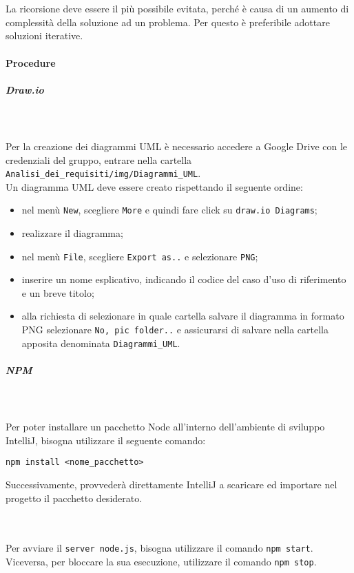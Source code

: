 		 \mbox{} \\ \mbox{} \\
		La ricorsione deve essere il più possibile evitata, perché è causa di un aumento di complessità della soluzione ad un problema. Per questo è preferibile adottare soluzioni iterative.
		\paragraph{Procedure}
	\subparagraph{Draw.io}
	 \mbox{} \\ \mbox{} \\
	Per la creazione dei diagrammi UML è necessario accedere a Google Drive con le credenziali del gruppo, entrare nella cartella \texttt{Analisi\_dei\_requisiti/img/Diagrammi\_UML}. \\ Un diagramma UML deve essere creato rispettando il seguente ordine: \begin{itemize}
\item nel menù \texttt{New}, scegliere \texttt{More} e quindi fare click su \texttt{draw.io Diagrams};
\item realizzare il diagramma;
\item nel menù \texttt{File}, scegliere \texttt{Export as..} e selezionare \texttt{PNG};
\item inserire un nome esplicativo, indicando il codice del caso d'uso di riferimento e un breve titolo;
\item alla richiesta di selezionare in quale cartella salvare il diagramma in formato PNG selezionare \texttt{No, pic folder..} e assicurarsi di salvare nella cartella apposita denominata \texttt{Diagrammi\_UML}.
\end{itemize}

	\subparagraph{NPM}
	 \mbox{} \\ \mbox{} \\
	Per poter installare un pacchetto Node all'interno dell'ambiente di sviluppo IntelliJ, bisogna utilizzare il seguente comando:\\
	\centerline{\texttt{npm install <nome\_pacchetto>}}
	Successivamente, provvederà direttamente IntelliJ a scaricare ed importare nel progetto il pacchetto desiderato.
	
	 \mbox{} \\ \mbox{} \\
	Per avviare il \texttt{server node.js}, bisogna utilizzare il comando \texttt{npm start}.\\
	Viceversa, per bloccare la sua esecuzione, utilizzare il comando \texttt{npm stop}.

